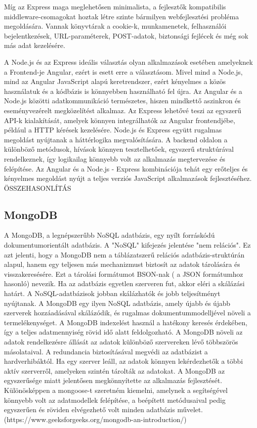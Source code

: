 Míg az Express maga meglehetősen minimalista, a fejlesztők kompatibilis middleware-csomagokat hoztak létre szinte bármilyen webfejlesztési probléma megoldására. Vannak könyvtárak a cookie-k, munkamenetek, felhasználói bejelentkezések, URL-paraméterek, POST-adatok, biztonsági fejlécek és még sok más adat kezelésére.


A Node.js és az Express ideális választás olyan alkalmazások esetében amelyeknek a Frontend-je Angular, ezért is esett erre a választásom. Mivel mind a Node.js, mind az Angular JavaScript alapú keretrendszer, ezért kényelmes a közös használatuk és a kódbázis is könnyebben használható fel újra.  Az Angular és a Node.js közötti adatkommunikáció természetes, hiszen mindkettő aszinkron és eseményvezérelt megközelítést alkalmaz. Az Express lehetővé teszi az egyszerű API-k kialakítását, amelyek könnyen integrálhatók az Angular frontendjébe, például a HTTP kérések kezelésére. Node.js és Express együtt rugalmas megoldást nyújtanak a háttérlogika megvalósítására. A backend oldalon a különböző metódusok, hívások könnyen tesztelhetőek, egyszerű struktúrával rendelkeznek, így logikailag könnyebb volt az alkalmazás megtervezése és felépítése. Az Angular és a Node.js - Express kombinációja tehát egy erőteljes és kényelmes megoldást nyújt a teljes verziós JavaScript alkalmazások fejlesztéséhez. 
ÖSSZEHASONLÍTÁS
\subsection{MongoDB}
A MongoDB, a legnépszerűbb NoSQL adatbázis, egy nyílt forráskódú dokumentumorientált adatbázis. A "NoSQL" kifejezés jelentése "nem relációs". Ez azt jelenti, hogy a MongoDB nem a táblázatszerű relációs adatbázis-struktúrán alapul, hanem egy teljesen más mechanizmust biztosít az adatok tárolására és visszakeresésére. Ezt a tárolási formátumot BSON-nak ( a JSON formátumhoz hasonló) nevezik. Ha az adatbázis egyetlen szerveren fut, akkor eléri a skálázási határt. A NoSQL-adatbázisok jobban skálázhatók és jobb teljesítményt nyújtanak. A MongoDB egy ilyen NoSQL adatbázis, amely újabb és újabb szerverek hozzáadásával skálázódik, és rugalmas dokumentummodelljével növeli a termelékenységet. A MongoDB indexelést használ a hatékony keresés érdekében, így a teljes adatmennyiség rövid idő alatt feldolgozható. A MongoDB növeli az adatok rendelkezésre állását az adatok különböző szervereken lévő többszörös másolataival. A redundancia biztosításával megvédi az adatbázist a hardverhibáktól. Ha egy szerver leáll, az adatok könnyen lekérdezhetők a többi aktív szerverről, amelyeken szintén tárolták az adatokat. A MongoDB az egyszerűsége miatt jelentősen megkönnyítette az alkalmazás fejlesztését. Különösképpen a mongoose-t szeretném kiemelni, amelynek a segítségével könnyebb volt az adatmodellek felépítése, a beépített metódusaival pedig egyszerűen és röviden elvégezhető volt minden adatbázis művelet. 
(https://www.geeksforgeeks.org/mongodb-an-introduction/)

